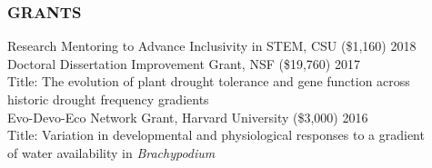 \documentclass[12pt,english]{article}
\begin{document}
\subsubsection*{GRANTS}
\vspace{-0.5ex}
\hspace*{1.0em} Research Mentoring to Advance Inclusivity in STEM, CSU (\$1,160)
\hfill
2018\vspace{1ex}\\
\hspace*{1.0em} Doctoral Dissertation Improvement Grant, NSF (\$19,760)
\hfill
2017\\
\hspace*{2.0em} Title: The evolution of plant drought tolerance and gene function across\\
\hspace*{2.0em} historic drought frequency gradients
\vspace{1ex}\\
\hspace*{1.0em} Evo-Devo-Eco Network Grant, Harvard University (\$3,000)
\hfill
2016\\
\hspace*{2.0em} Title: Variation  in  developmental  and  physiological  responses  to  a  gradient\\ \hspace*{2.0em} of water availability in \textit{Brachypodium}
\vspace{1ex}

\end{document}
